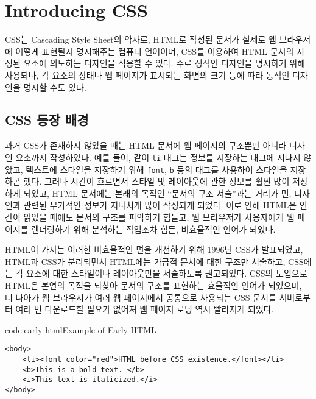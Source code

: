 \section{Introducing CSS} \label{sect:introducing-css}

CSS는 Cascading Style Sheet의 약자로, HTML로 작성된 문서가 실제로 웹 브라우저에 어떻게 표현될지 명시해주는 컴퓨터 언어이며, CSS를 이용하여 HTML 문서의 지정된 요소에 의도하는 디자인을 적용할 수 있다. 주로 정적인 디자인을 명시하기 위해 사용되나, 각 요소의 상태나 웹 페이지가 표시되는 화면의 크기 등에 따라 동적인 디자인을 명시할 수도 있다.

\subsection*{CSS 등장 배경}
과거 CSS가 존재하지 않았을 때는 HTML 문서에 웹 페이지의 구조뿐만 아니라 디자인 요소까지 작성하였다. 예를 들어, \과 같이 \texttt{li} 태그는 정보를 저장하는 태그에 지나지 않았고, 텍스트에 스타일을 저장하기 위해 \texttt{font}, \texttt{b} 등의 태그를 사용하여 스타일을 저장하곤 했다. 그러나 시간이 흐르면서 스타일 및 레이아웃에 관한 정보를 훨씬 많이 저장하게 되었고, HTML 문서에는 본래의 목적인 ``문서의 구조 서술''과는 거리가 먼, 디자인과 관련된 부가적인 정보가 지나치게 많이 작성되게 되었다. 이로 인해 HTML은 인간이 읽었을 때에도 문서의 구조를 파악하기 힘들고, 웹 브라우저가 사용자에게 웹 페이지를 렌더링하기 위해 분석하는 작업조차 힘든, 비효율적인 언어가 되었다. 

HTML이 가지는 이러한 비효율적인 면을 개선하기 위해 1996년 CSS가 발표되었고, HTML과 CSS가 분리되면서 HTML에는 가급적 문서에 대한 구조만 서술하고, CSS에는 각 요소에 대한 스타일이나 레이아웃만을 서술하도록 권고되었다. CSS의 도입으로 HTML은 본연의 목적을 되찾아 문서의 구조를 표현하는 효율적인 언어가 되었으며, 더 나아가 웹 브라우저가 여러 웹 페이지에서 공통으로 사용되는 CSS 문서를 서버로부터 여러 번 다운로드할 필요가 없어져 웹 페이지 로딩 역시 빨라지게 되었다.

\begin{codeenv}{code:early-html}{Example of Early HTML}\begin{verbatim}
<body>
    <li><font color="red">HTML before CSS existence.</font></li>
    <b>This is a bold text. </b>
    <i>This text is italicized.</i>
</body>
\end{verbatim}
\end{codeenv}
